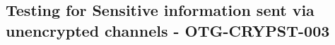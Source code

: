 \subsection{Testing for Sensitive information sent via unencrypted channels - OTG-CRYPST-003}
\clearpage